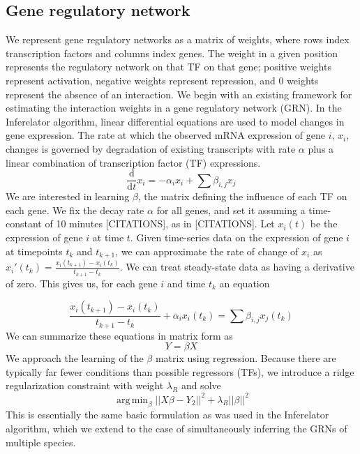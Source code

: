 \documentclass[11pt]{article}
\DeclareMathOperator*{\argmin}{arg\,min}
\begin{document}
\subsection{Gene regulatory network}
We represent gene regulatory networks as a matrix of weights, where rows index transcription factors and columns index genes. The weight in a given position represents the regulatory network on that TF on that gene; positive weights represent activation, negative weights represent repression, and 0 weights represent the absence of an interaction. We begin with an existing framework for estimating the interaction weights in a gene regulatory network (GRN). In the Inferelator algorithm, linear differential equations are used to model changes in gene expression. The rate at which the observed mRNA expression of gene $i$, $x_i$, changes is governed by degradation of existing transcripts with rate $\alpha$ plus a linear combination of transcription factor (TF) expressions. 
\begin{equation}
\frac{\mathrm d}{\mathrm d t} x_i = -\alpha_{i}x_{i} + \sum \beta_{i,j}x_{j}
\end{equation}
We are interested in learning $\beta$, the matrix defining the influence of each TF on each gene. We fix the decay rate $\alpha$ for all genes, and set it assuming a time-constant of 10 minutes [CITATIONS], as in [CITATIONS]. Let $x_i(t)$ be the expression of gene $i$ at time $t$. Given time-series data on the expression of gene $i$ at timepoints $t_k$ and $t_{k+1}$, we can approximate the rate of change of $x_i$ as $x_i'(t_k)=\frac{x_i(t_{k+1})-x_i(t_k)}{t_{k+1}-t_k}$. We can treat steady-state data as having a derivative of zero. This gives us, for each gene $i$ and time $t_{k}$ an equation

\begin{equation}
\frac{x_i(t_{k+1})-x_i(t_k)}{t_{k+1}-t_k} + \alpha_{i}x_{i}(t_k)= \sum \beta_{i,j}x_{j}(t_k)
\end{equation}
\noindent We can summarize these equations in matrix form as
\begin{equation}
Y = \beta X
\end{equation}
\noindent We approach the learning of the $\beta$ matrix using regression. Because there are typically far fewer conditions than possible regressors (TFs), we introduce a ridge regularization constraint with weight $\lambda_R$ and solve
\begin{equation}
\argmin_\beta\vert \vert X\beta - Y_2 \vert \vert ^2 + \lambda_R \vert \vert \beta \vert \vert ^2
\end{equation}
This is essentially the same basic formulation as was used in the Inferelator algorithm, which we extend to the case of simultaneously inferring the GRNs of multiple species. 
\end{document}
